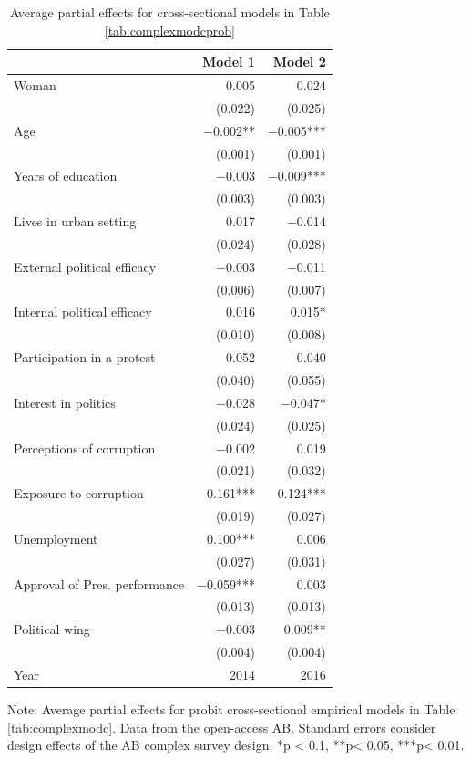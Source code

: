 \documentclass[floatsintext,man]{apa7}\usepackage[]{graphicx}\usepackage[]{color}
\begin{document}
\begin{table}[H]
\begin{center}
\caption{Average partial effects for cross-sectional models in Table \ref{tab:complexmodcprob}}
\label{tab:apecrossprobit}

\begin{tabular}[t]{lrr}
\toprule
  & Model 1 & Model 2\\
\midrule
Woman & \num{0.005} & \num{0.024}\\
 & (\num{0.022}) & (\num{0.025})\\
Age & \num{-0.002}** & \num{-0.005}***\\
 & (\num{0.001}) & (\num{0.001})\\
Years of education & \num{-0.003} & \num{-0.009}***\\
 & (\num{0.003}) & (\num{0.003})\\
Lives in urban setting & \num{0.017} & \num{-0.014}\\
 & (\num{0.024}) & (\num{0.028})\\
External political efficacy & \num{-0.003} & \num{-0.011}\\
 & (\num{0.006}) & (\num{0.007})\\
Internal political efficacy & \num{0.016} & \num{0.015}*\\
 & (\num{0.010}) & (\num{0.008})\\
Participation in a protest & \num{0.052} & \num{0.040}\\
 & (\num{0.040}) & (\num{0.055})\\
Interest in politics & \num{-0.028} & \num{-0.047}*\\
 & (\num{0.024}) & (\num{0.025})\\
Perceptions of corruption & \num{-0.002} & \num{0.019}\\
 & (\num{0.021}) & (\num{0.032})\\
Exposure to corruption & \num{0.161}*** & \num{0.124}***\\
 & (\num{0.019}) & (\num{0.027})\\
Unemployment & \num{0.100}*** & \num{0.006}\\
 & (\num{0.027}) & (\num{0.031})\\
Approval of Pres. performance & \num{-0.059}*** & \num{0.003}\\
 & (\num{0.013}) & (\num{0.013})\\
Political wing & \num{-0.003} & \num{0.009}**\\
 & (\num{0.004}) & (\num{0.004})\\
Year & 2014 & 2016\\
\bottomrule
\end{tabular}


\end{center}
Note: Average partial effects for probit cross-sectional empirical models in Table \ref{tab:complexmodc}. Data from the open-access AB. Standard errors consider design effects of the AB complex survey design. 
*p < 0.1, **p< 0.05, ***p< 0.01.
\end{table}
\clearpage
\end{document}
